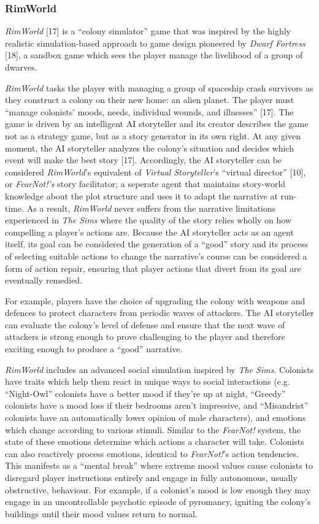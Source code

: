 \documentclass{sig-alternate-05-2015}
\begin{document}
\subsubsection{RimWorld}
\textit{RimWorld} [17] is a ``colony simulator'' game that was inspired by the highly realistic simulation-based approach to game design pioneered by \textit{Dwarf Fortress} [18], a sandbox game which sees the player manage the livelihood of a group of dwarves.

\textit{RimWorld} tasks the player with managing a group of spaceship crash survivors as they construct a colony on their new home: an alien planet. The player must ``manage colonists' moods, needs, individual wounds, and illnesses'' [17]. The game is driven by an intelligent AI storyteller and its creator describes the game not as a strategy game, but as a story generator in its own right. At any given moment, the AI storyteller analyzes the colony's situation and decides which event will make the best story [17]. Accordingly, the AI storyteller can be considered \textit{RimWorld}'s equivalent of \textit{Virtual Storyteller}'s ``virtual director'' [10], or \textit{FearNot!'s} story facilitator;  a seperate agent that maintains story-world knowledge about the plot structure and uses it to adapt the narrative at run-time. As a result, \textit{RimWorld} never suffers from the narrative limitations experienced in \textit{The Sims} where the quality of the story relies wholly on how compelling a player's actions are. Because the AI storyteller acts as an agent itself, its goal can be considered the generation of a ``good'' story and its process of selecting suitable actions to change the narrative's course can be considered a form of action repair, ensuring that player actions that divert from its goal are eventually remedied. 

For example, players have the choice of upgrading the colony with weapons and defences to protect characters from periodic waves of attackers. The AI storyteller can evaluate the colony's level of defense and ensure that the next wave of attackers is strong enough to prove challenging to the player and therefore exciting enough to produce a ``good'' narrative.

\textit{RimWorld} includes an advanced social simulation inspired by \textit{The Sims}. Colonists have traits which help them react in unique ways to social interactions (e.g. ``Night-Owl'' colonists have a better mood if they're up at night, ``Greedy'' colonists have a mood loss if their bedrooms aren't impressive, and ``Misandrist'' colonists have an automatically lower opinion of male characters), and emotions which change according to various stimuli. Similar to the \textit{FearNot!} system, the state of these emotions determine which actions a character will take. Colonists can also reactively process emotions, identical to \textit{FearNot!}'s action tendencies. This manifests as a ``mental break'' where extreme mood values cause colonists to disregard player instructions entirely and engage in fully autonomous, usually obstructive, behaviour. For example, if a colonist's mood is low enough they may engage in an uncontrollable psychotic episode of pyromancy, igniting the colony's buildings until their mood values return to normal.
\end{document}
